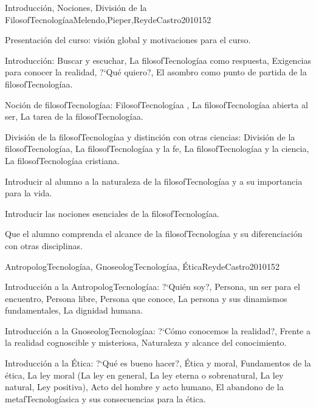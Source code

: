 \begin{syllabus}
\begin{unit}{Introducción, Nociones, División de la FilosofTecnologíaa}{Melendo,Pieper,ReydeCastro2010}{15}{2}
\begin{topics}
	\item Presentación del curso: visión global y motivaciones para el curso.
	\item Introducción: Buscar y escuchar, La filosofTecnologíaa como respuesta, Exigencias para conocer la realidad, ?`Qué quiero?, El asombro como punto de partida de la filosofTecnologíaa.
	\item Noción de filosofTecnologíaa:  FilosofTecnologíaa , La filosofTecnologíaa abierta al ser, La tarea de la filosofTecnologíaa.
	\item División de la filosofTecnologíaa y distinción con otras ciencias: División de la filosofTecnologíaa, La filosofTecnologíaa y la fe, La filosofTecnologíaa y la ciencia,  La filosofTecnologíaa cristiana.
\end{topics}
\begin{learningoutcomes}
	\item Introducir al alumno a la naturaleza de la filosofTecnologíaa y a su importancia para la vida.
	\item Introducir las nociones esenciales de la filosofTecnologíaa.
	\item Que el alumno comprenda el alcance de la filosofTecnologíaa y su diferenciación con otras disciplinas.
\end{learningoutcomes}
\end{unit}

\begin{unit}{AntropologTecnologíaa, GnoseologTecnologíaa, Ética}{ReydeCastro2010}{15}{2}
\begin{topics}
	\item Introducción a la AntropologTecnologíaa: ?`Quién soy?, Persona, un ser para el encuentro, Persona libre, Persona que conoce, La persona y sus dinamismos fundamentales, La dignidad humana.
	\item Introducción a la GnoseologTecnologíaa: ?`Cómo conocemos la realidad?, Frente a la realidad cognoscible y misteriosa, Naturaleza y alcance del conocimiento.
	\item Introducción a la Ética: ?`Qué es bueno hacer?, Ética y moral, Fundamentos de la ética, La ley moral (La ley en general, La ley eterna o sobrenatural, La ley natural, Ley positiva), Acto del hombre y acto humano, El abandono de la metafTecnologíasica y sus consecuencias para la ética.
\end{topics}


\end{unit}
\end{syllabus}
